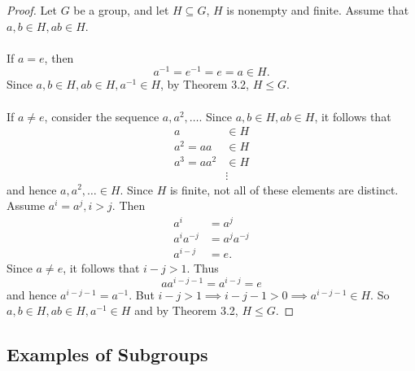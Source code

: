 \documentclass{article}
\newtheorem{theorem}{Theorem}[section]
\theoremstyle{definition}
\newtheorem{definition}{Definition}[section]
\begin{document}
    \begin{proof}
        Let $G$ be a group, and let $H \subseteq G$,  $H$ is nonempty and finite. Assume that $a,b \in H, ab \in H$.
        \\ \\
        If $a=e$, then 
        \begin{equation*}
            a^{-1} = e^{-1} = e = a \in H.
        \end{equation*}
        Since $a,b \in H, ab \in H, a^{-1} \in H$, by Theorem 3.2, $H \leq G$. 
        \\ \\
        If $a \neq e$, consider the sequence $a, a^2, \dots$. Since $a,b \in H,ab \in H$, it follows that
        \begin{align*}
            a &\in H \\
            a^2 = aa &\in H \\
            a^3 = aa^2 &\in H \\
            &\vdots
        \end{align*}
        and hence $a,a^2,\dots \in H$. Since $H$ is finite, not all of these elements are distinct. Assume $a^i=a^j, i> j$. Then 
        \begin{align*}
            a^i &= a^j \\
            a^ia^{-j} &= a^ja^{-j} \\
            a^{i-j} &= e.
        \end{align*}
        Since $a \neq e$, it follows that $i-j>1$. Thus
        \begin{equation*}
            aa^{i-j-1} = a^{i-j} = e
        \end{equation*}
        and hence $a^{i-j-1}=a^{-1}$. But $i-j>1 \implies i-j-1 >0 \implies a^{i-j-1} \in H$. So $a,b \in H, ab \in H, a^{-1} \in H$ and by Theorem 3.2, $H \leq G$.
    \end{proof}
    
    \subsection{Examples of Subgroups}
    \\ \\
    
\end{document}
